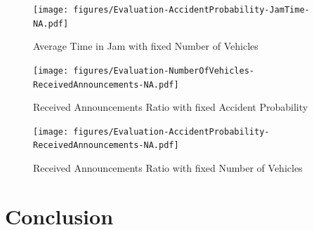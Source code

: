 \documentclass[]{nsm-thesis}
\begin{document}
\begin{figure}
	\centering
	\texttt{[image: figures/Evaluation-AccidentProbability-JamTime-NA.pdf]}
	\caption{Average Time in Jam with fixed Number of Vehicles}
	\label{fig:Evaluation-AccidentProbability-JamTime-NA}
\end{figure}

\begin{figure}
	\centering
	\texttt{[image: figures/Evaluation-NumberOfVehicles-ReceivedAnnouncements-NA.pdf]}
	\caption{Received Announcements Ratio with fixed Accident Probability}
	\label{fig:Evaluation-NumberOfVehicles-ReceivedAnnouncements-NA}
\end{figure}

\begin{figure}
	\centering
	\texttt{[image: figures/Evaluation-AccidentProbability-ReceivedAnnouncements-NA.pdf]}
	\caption{Received Announcements Ratio with fixed Number of Vehicles}
	\label{fig:Evaluation-AccidentProbability-ReceivedAnnouncements-NA}
\end{figure}


\chapter{Conclusion}

\cleardoublepage

\listofabbreviations
\clearpage

\listoffigures
\clearpage

\listoftables
\clearpage

\printbibliography
\end{document}
